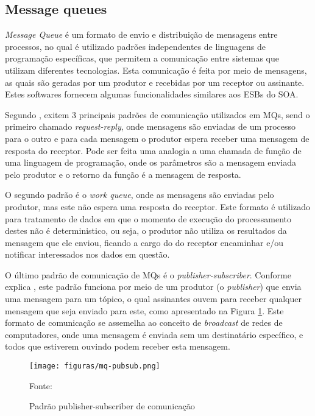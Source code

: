 \subsection{Message queues}

\emph{Message Queue} é um formato de envio e distribuição de mensagens
entre processos, no qual é utilizado padrões independentes de linguagens
de programação específicas, que permitem a comunicação entre sistemas que
utilizam diferentes tecnologias. Esta comunicação é feita por meio de
mensagens, as quais são geradas por um produtor e recebidas por um receptor
ou assinante. Estes softwares fornecem algumas funcionalidades similares aos
\acp{ESB} do \ac{SOA}.

Segundo , exitem 3 principais padrões de comunicação
utilizados em \acp{MQ}, send o primeiro chamado \emph{request-reply}, onde
mensagens são enviadas de um processo para o outro e para cada mensagem o
produtor espera receber uma mensagem de resposta do receptor. Pode ser feita
uma analogia a uma chamada de função de uma linguagem de programação, onde os
parâmetros são a mensagem enviada pelo produtor e o retorno da função é a
mensagem de resposta.

O segundo padrão é o \emph{work queue}, onde as mensagens são enviadas pelo
produtor, mas este não espera uma resposta do receptor. Este formato é
utilizado para tratamento de dados em que o momento de execução do
processamento destes não é deterministico, ou seja, o produtor não utiliza
os resultados da mensagem que ele enviou, ficando a cargo do do receptor
encaminhar e/ou notificar interessados nos dados em questão.

O último padrão de comunicação de \acp{MQ} é o \emph{publisher-subscriber}.
Conforme explica , este padrão funciona por meio de
um produtor (o \emph{publisher}) que envia uma mensagem para um tópico, o
qual assinantes ouvem para receber qualquer mensagem que seja enviado para
este, como apresentado na Figura \ref{fig:mq-pubsub}. Este formato de
comunicação se assemelha ao conceito de \emph{broadcast} de redes de
computadores, onde uma mensagem é enviada sem um destinatário específico,
e todos que estiverem ouvindo podem receber esta mensagem.

\begin{figure}[H]
	\centering
	\caption{Padrão publisher-subscriber de comunicação}
	\texttt{[image: figuras/mq-pubsub.png]}

	\label{fig:mq-pubsub}
	\footnotesize Fonte: 
\end{figure}


